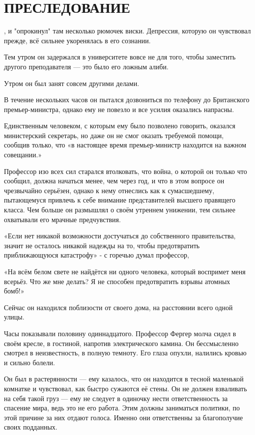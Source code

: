 \documentclass[a4paper,12pt]{book}
\begin{document}
\chapter{ПРЕСЛЕДОВАНИЕ}
\noindent{}, и "опрокинул" там несколько рюмочек виски. Депрессия, которую он чувствовал прежде, всё сильнее укоренялась в его сознании.
\par
Тем утром он задержался в университете вовсе не для того, чтобы заместить другого преподавателя — это было его ложным алиби.
\par
Утром он был занят совсем другими делами.
\par
В течение нескольких часов он пытался дозвониться по телефону до Британского премьер-министра, однако ему не повезло и все усилия оказались напрасны.
\par
Единственным человеком, с которым ему было позволено говорить, оказался министерский секретарь, но даже он не смог оказать требуемой помощи, сообщив только, что «в настоящее время премьер-министр находится на важном совещании.»
\par
Профессор изо всех сил старался втолковать, что война, о которой он только что сообщил, должна начаться менее, чем через год, и что в этом вопросе он чрезвычайно серьёзен, однако к нему отнеслись как к сумасшедшему, пытающемуся привлечь к себе внимание представителей высшего правящего класса. Чем больше он размышлял о своём утреннем унижении, тем сильнее охватывали его мрачные предчувствия.
\par
«Если нет никакой возможности достучаться до собственного правительства, значит не осталось никакой надежды на то, чтобы предотвратить приближающуюся катастрофу» - с горечью думал профессор,
\par
«На всём белом свете не найдётся ни одного человека, который воспримет меня всерьёз. Что же мне делать? Я не способен предотвратить взрывы атомных бомб!»
\par
Сейчас он находился поблизости от своего дома, на расстоянии всего одной улицы.\\
\par
Часы показывали половину одиннадцатого. Профессор Фергер молча сидел в своём кресле, в гостиной, напротив электрического камина. Он бессмысленно смотрел в неизвестность, в полную темноту. Его глаза опухли, налились кровью и сильно болели.
\par
Он был в растерянности — ему казалось, что он находится в тесной маленькой комнатке и чувствовал, как быстро сужаются её стены. Он не должен взваливать на себя такой груз — ему не следует в одиночку нести ответственность за спасение мира, ведь это не его работа. Этим должны заниматься политики, по этой причине за них отдают голоса. Именно они ответственны за благополучие своих подданных.
\end{document}

